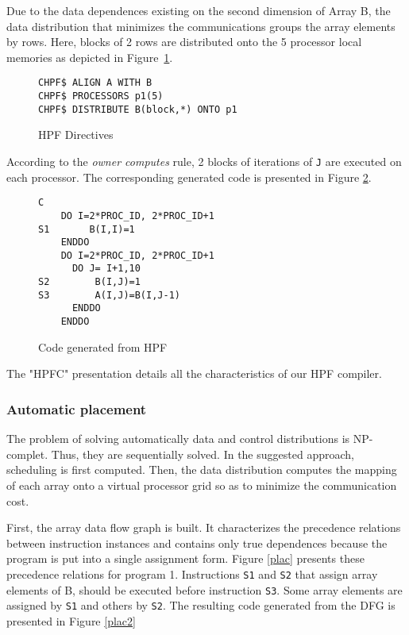 Due to the data dependences existing on the second dimension of Array B, 
the data distribution that minimizes
the communications groups the array elements by rows. Here,
 blocks of 2 rows are distributed onto the 5 processor local memories as 
depicted in Figure~\ref{direct}.

\begin{figure}[htp]
\begin{verbatim}
CHPF$ ALIGN A WITH B
CHPF$ PROCESSORS p1(5)
CHPF$ DISTRIBUTE B(block,*) ONTO p1
\end{verbatim}
\caption{ HPF Directives}
\label{direct}
\end{figure}

According to the {\it owner computes} rule,  2 blocks of
iterations of \verb+J+ are executed on each processor. The corresponding 
generated code is presented in Figure \ref{hpfcc}.

\begin{figure}[htp]
\begin{verbatim}
C
    DO I=2*PROC_ID, 2*PROC_ID+1
S1       B(I,I)=1
    ENDDO
    DO I=2*PROC_ID, 2*PROC_ID+1
      DO J= I+1,10
S2        B(I,J)=1
S3        A(I,J)=B(I,J-1)
      ENDDO
    ENDDO  
\end{verbatim}
\caption{Code generated from HPF}
\label{hpfcc}
\end{figure}

The "HPFC" presentation details all the characteristics of our HPF compiler.

\subsubsection{Automatic placement}

The problem of solving automatically data and control distributions is
NP-complet. Thus, they are sequentially solved. In the suggested approach,
scheduling is first computed. Then, the data distribution computes the mapping
of each array onto a virtual processor grid so as to minimize 
the communication cost.

First, the array data flow graph is built. It characterizes the 
 precedence relations between instruction instances and contains only true 
dependences because the program is put into a single assignment form. 
 Figure \ref{plac} presents these precedence relations for program 1. 
Instructions \verb+S1+ and \verb+S2+ that assign array elements of B, should 
be executed before instruction \verb+S3+. Some array elements are assigned
by \verb+S1+ and others by \verb+S2+. The resulting code generated from the 
DFG is presented in Figure \ref{plac2}


